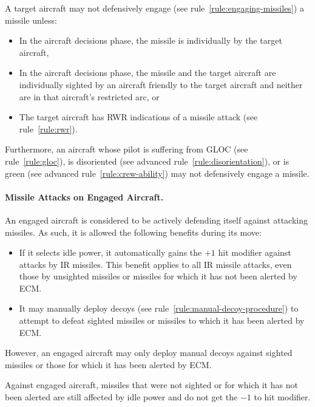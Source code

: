 {A target aircraft may not defensively engage (see rule~\ref{rule:engaging-missiles}) a missile  unless:
\begin{itemize}
    \item In the aircraft decisions phase, the missile is individually by the target aircraft, 
    \item In the aircraft decisions phase, the missile and the target aircraft are individually sighted by an aircraft friendly to the target aircraft and neither are in that aircraft’s restricted arc, or
    \item The target aircraft has RWR indications of a missile attack (see rule~\ref{rule:rwr}).
\end{itemize}
Furthermore, an aircraft whose pilot is suffering from GLOC (see rule~\ref{rule:gloc}), is disoriented (see advanced rule~\ref{rule:disorientation}), or is green (see advanced rule~\ref{rule:crew-ability}) may not defensively engage a missile.


\paragraph{Missile Attacks on Engaged Aircraft.} An engaged aircraft is considered to be actively defending itself against attacking missiles. As such, it is allowed the following benefits during its move:

\begin{itemize}

    \item If it selects idle power, it automatically gains the $+1$ hit modifier against attacks by IR missiles. This benefit applies to all IR missile attacks, even those by unsighted missiles or missiles for which it has not been alerted by ECM.
    
    \item It may manually deploy decoys (see rule~\ref{rule:manual-decoy-procedure}) to attempt to defeat sighted missiles or missiles to which it has been alerted by ECM.
    
\end{itemize}


However, an engaged aircraft may only deploy manual decoys against sighted missiles or those for which it has been alerted by ECM. 

Against engaged aircraft, missiles that were not sighted or for which it has not been alerted are still affected by idle power and do not get the $-1$ to hit modifier.

}
